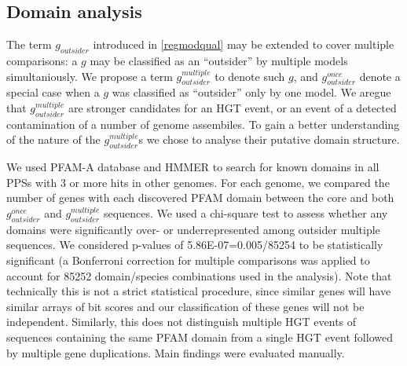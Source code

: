 \subsection{Domain analysis}
The term $g_{outsider}$ introduced in \ref{regmodqual} may be extended to
cover multiple comparisons: a $g$ may be classified as an ``outsider'' by
multiple models simultaniously. We propose a term $g_{outsider}^{multiple}$ to
denote such $g$, and $g_{outsider}^{once}$ denote a special case when a $g$ was
classified as ``outsider'' only by one model. We aregue that
$g_{outsider}^{multiple}$ are stronger candidates for an HGT event, or an event
of a detected contamination of a number of genome assembiles. To gain a better
understanding of the nature of the $g_{outsider}^{multiple}$s we chose to
analyse their putative domain structure.

We used PFAM-A \cite{Finn2014} database and HMMER \cite{Prakash2017} to search
for known domains in all PPSs with 3 or more hits in other genomes. 
For each genome, we compared the number of genes with each discovered PFAM domain
between the core and both $g_{outsider}^{once}$ and $g_{outsider}^{multiple}$ sequences.
We used a chi-square test to assess whether any domains were significantly
over- or underrepresented among outsider multiple sequences.  We considered
p-values of 5.86E-07=0.005/85254 to be statistically significant (a Bonferroni
correction for multiple comparisons was applied to account for 85252
domain/species combinations used in the analysis). Note that technically this
is not a strict statistical procedure, since similar genes will have similar
arrays of bit scores and our classification of these genes will not be
independent. Similarly, this does not distinguish multiple HGT events of
sequences containing the same PFAM domain from a single HGT event followed by
multiple gene duplications. Main findings were evaluated manually.
